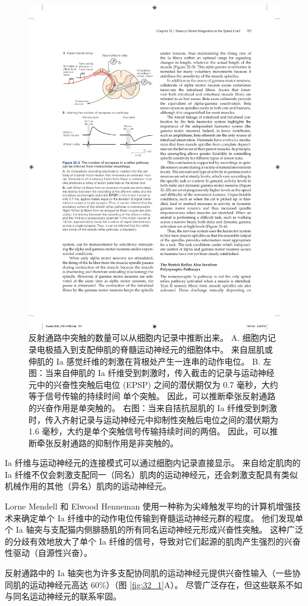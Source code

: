 \begin{figure}[htbp]
	\centering
	\includegraphics[width=0.5\linewidth]{chap32/fig_32_3}
	\caption{反射通路中突触的数量可以从细胞内记录中推断出来。
		A. 细胞内记录电极插入到支配伸肌的脊髓运动神经元的细胞体中。
		来自屈肌或伸肌的 Ia 感觉纤维的刺激在背根处产生一连串的动作电位。
		B. 左图：当来自伸肌的 Ia 纤维受到刺激时，传入截击的记录与运动神经元中的兴奋性突触后电位 (EPSP) 之间的潜伏期仅为 0.7 毫秒，大约等于信号传输的持续时间 单个突触。
		因此，可以推断牵张反射通路的兴奋作用是单突触的。
		右图：当来自拮抗屈肌的 Ia 纤维受到刺激时，传入齐射记录与运动神经元中抑制性突触后电位之间的潜伏期为 1.6 毫秒，大约是单个突触信号传输持续时间的两倍。
		因此，可以推断牵张反射通路的抑制作用是非突触的。}
	\label{fig:32_3}
\end{figure}


Ia 纤维与运动神经元的连接模式可以通过细胞内记录直接显示。
来自给定肌肉的 Ia 纤维不仅会刺激支配同一（同名）肌肉的运动神经元，还会刺激支配具有类似机械作用的其他（异名）肌肉的运动神经元。


Lorne Mendell 和 Elwood Henneman 使用一种称为尖峰触发平均的计算机增强技术来确定单个 Ia 纤维中的动作电位传输到脊髓运动神经元群的程度。
他们发现单个 Ia 轴突与支配猫内侧腓肠肌的所有同名运动神经元形成兴奋性突触。
这种广泛的分歧有效地放大了单个 Ia 纤维的信号，导致对它们起源的肌肉产生强烈的兴奋性驱动（自源性兴奋）。


反射通路中的 Ia 轴突也为许多支配协同肌的运动神经元提供兴奋性输入（一些协同肌的运动神经元高达 60\%）（图 \ref{fig:32_1}A）。 
尽管广泛存在，但这些联系不如与同名运动神经元的联系牢固。


